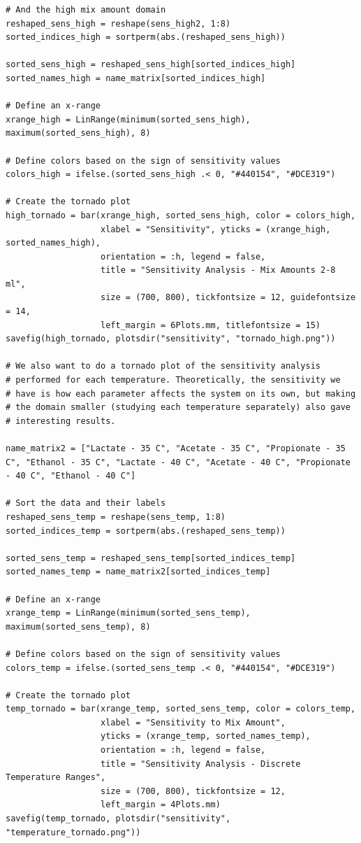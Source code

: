 \documentclass[11pt]{article}
\begin{document}
\begin{verbatim}
# And the high mix amount domain
reshaped_sens_high = reshape(sens_high2, 1:8)
sorted_indices_high = sortperm(abs.(reshaped_sens_high))

sorted_sens_high = reshaped_sens_high[sorted_indices_high]
sorted_names_high = name_matrix[sorted_indices_high]

# Define an x-range
xrange_high = LinRange(minimum(sorted_sens_high), maximum(sorted_sens_high), 8)

# Define colors based on the sign of sensitivity values
colors_high = ifelse.(sorted_sens_high .< 0, "#440154", "#DCE319")

# Create the tornado plot
high_tornado = bar(xrange_high, sorted_sens_high, color = colors_high,
                   xlabel = "Sensitivity", yticks = (xrange_high, sorted_names_high),
                   orientation = :h, legend = false,
                   title = "Sensitivity Analysis - Mix Amounts 2-8 ml",
                   size = (700, 800), tickfontsize = 12, guidefontsize = 14,
                   left_margin = 6Plots.mm, titlefontsize = 15)
savefig(high_tornado, plotsdir("sensitivity", "tornado_high.png"))

# We also want to do a tornado plot of the sensitivity analysis
# performed for each temperature. Theoretically, the sensitivity we
# have is how each parameter affects the system on its own, but making
# the domain smaller (studying each temperature separately) also gave
# interesting results.

name_matrix2 = ["Lactate - 35 C", "Acetate - 35 C", "Propionate - 35 C", "Ethanol - 35 C", "Lactate - 40 C", "Acetate - 40 C", "Propionate - 40 C", "Ethanol - 40 C"]

# Sort the data and their labels
reshaped_sens_temp = reshape(sens_temp, 1:8)
sorted_indices_temp = sortperm(abs.(reshaped_sens_temp))

sorted_sens_temp = reshaped_sens_temp[sorted_indices_temp]
sorted_names_temp = name_matrix2[sorted_indices_temp]

# Define an x-range
xrange_temp = LinRange(minimum(sorted_sens_temp), maximum(sorted_sens_temp), 8)

# Define colors based on the sign of sensitivity values
colors_temp = ifelse.(sorted_sens_temp .< 0, "#440154", "#DCE319")

# Create the tornado plot
temp_tornado = bar(xrange_temp, sorted_sens_temp, color = colors_temp,
                   xlabel = "Sensitivity to Mix Amount",
                   yticks = (xrange_temp, sorted_names_temp),
                   orientation = :h, legend = false,
                   title = "Sensitivity Analysis - Discrete Temperature Ranges",
                   size = (700, 800), tickfontsize = 12,
                   left_margin = 4Plots.mm)
savefig(temp_tornado, plotsdir("sensitivity", "temperature_tornado.png"))


\end{verbatim}
\end{document}

